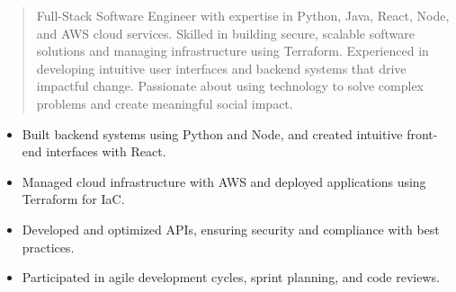 



\makecvheader

\begin{quote}
  \noindent
  Full-Stack Software Engineer with expertise in Python, Java, React, Node, and AWS cloud services. Skilled in building secure, scalable software solutions and managing infrastructure using Terraform. Experienced in developing intuitive user interfaces and backend systems that drive impactful change. Passionate about using technology to solve complex problems and create meaningful social impact.
\end{quote}

\par\smallskip
\noindent
\begin{minipage}{20cm}
  \begin{minipage}{9.75cm}
    \begin{itemize}
      \item Built backend systems using Python and Node, and created intuitive front-end interfaces with React.
      \item Managed cloud infrastructure with AWS and deployed applications using Terraform for IaC.
    \end{itemize}
  \end{minipage}
  \hfill
  \begin{minipage}{9.75cm}
    \begin{itemize}
      \item Developed and optimized APIs, ensuring security and compliance with best practices.
      \item Participated in agile development cycles, sprint planning, and code reviews.
    \end{itemize}
  \end{minipage}
\end{minipage}
\par\smallskip
\divider

